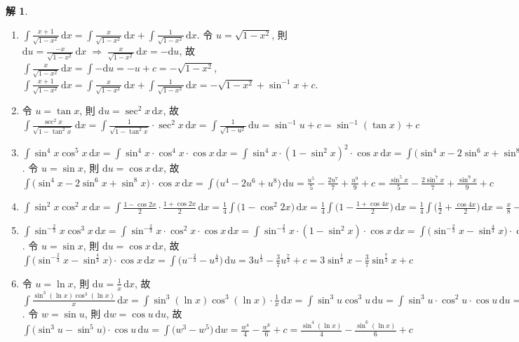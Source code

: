 \documentclass[12pt]{extarticle}
\newcommand{\ds}{\displaystyle}
\newcommand{\ie}{\;\Longrightarrow\;}
\theoremstyle{definition}
\newtheorem*{sol}{解}
\begin{document}
\begin{sol}
\begin{enumerate}
    \item $\ds\int\!\frac{x + 1}{\sqrt{1 - x^2}}\,\text{d}x = \int\!\frac{x}{\sqrt{1 - x^2}}\,\text{d}x + \int\!\frac{1}{\sqrt{1 - x^2}}\,\text{d}x$. 令 $\ds u = \sqrt{1 - x^2}$, 則 $\ds\text{d}u = \frac{-x}{\sqrt{1 - x^2}}\,\text{d}x\ie \frac{x}{\sqrt{1 - x^2}}\,\text{d}x = -\text{d}u$, 故 $\ds\int\!\frac{x}{\sqrt{1 - x^2}}\,\text{d}x = \int-\text{d}u = -u + c = -\sqrt{1 - x^2}$, $\ds\int\!\frac{x + 1}{\sqrt{1 - x^2}}\,\text{d}x = \int\!\frac{x}{\sqrt{1 - x^2}}\,\text{d}x + \int\!\frac{1}{\sqrt{1 - x^2}}\,\text{d}x = -\sqrt{1 - x^2} + \sin^{-1}x + c$. 
    \item 令 $\ds u = \tan x$, 則 $\ds\text{d}u = \sec^2 x\,\text{d}x$, 故 $\ds\int\!\frac{\sec^2 x}{\sqrt{1 - \tan^2 x}}\,\text{d}x = \int\!\frac{1}{\sqrt{1 - \tan^2 x}}\cdot \sec^2 x\,\text{d}x = \int\!\frac{1}{\sqrt{1 - u^2}}\,\text{d}u = \sin^{-1} u + c = \sin^{-1}(\tan{x}) + c $
    \item $\ds\int\!\sin^4 x\cos^5 x\,\text{d}x = \int\!\sin^4 x\cdot\cos^4 x\cdot\cos x\,\text{d}x = \int\!\sin^4x\cdot(1 - \sin^2 x)^2\cdot\cos x\,\text{d}x = \int\!\big(\sin^4x  - 2\sin^6x + \sin^8x\big)\cdot\cos x\,\text{d}x$.  令 $\ds u = \sin x$, 則 $\ds\text{d}u = \cos x\,\text{d}x$, 故 $\ds\int\!\big(\sin^4x  - 2\sin^6x + \sin^8x\big)\cdot\cos x\,\text{d}x = \int\!\big(u^4 - 2u^6 + u^8\big)\,\text{d}u = \frac{u^5}{5} - \frac{2u^7}{7} + \frac{u^9}{9} + c = \frac{\sin^5 x}{5} - \frac{2\sin^7 x}{7} + \frac{\sin^9 x}{9} + c$
    \item $\ds\int\!\sin^2 x\cos^2 x\,\text{d}x = \int\!\frac{1 - \cos 2x}{2}\cdot\frac{1 + \cos 2x}{2}\,\text{d}x = \frac{1}{4}\int\!\big(1 - \cos^2{2x}\big)\,\text{d}x = \frac{1}{4}\int\!\Big(1 - \frac{1 + \cos 4x}{2}\Big)\,\text{d}x = \frac{1}{4}\int\!\Big(\frac{1}{2} + \frac{\cos 4x}{2}\Big)\,\text{d}x = \frac{x}{8} - \frac{\sin 4x}{32} + c$
    \item $\ds\int\!\sin^{-\frac{2}{3}} x\cos^3 x\,\text{d}x = \int\!\sin^{-\frac{2}{3}} x\cdot\cos^2 x\cdot\cos x\,\text{d}x = \int\!\sin^{-\frac{2}{3}} x\cdot(1 - \sin^2 x)\cdot\cos x\,\text{d}x = \int\!\big(\sin^{-\frac{2}{3}} x - \sin^{\frac{4}{3}} x\big)\cdot\cos x\,\text{d}x$. 令 $u = \sin x$, 則 $\ds\text{d}u = \cos x\,\text{d}x$, 故 $\ds\int\!\big(\sin^{-\frac{2}{3}} x - \sin^{\frac{4}{3}} x\big)\cdot\cos x\,\text{d}x = \int\!\big(u^{-\frac{2}{3}} - u^{\frac{4}{3}}\big)\,\text{d}u = 3u^{\frac{1}{3}} - \frac{3}{7}u^{\frac{7}{3}} + c = 3\sin^{\frac{1}{3}}x - \frac{3}{7}\sin^{\frac{7}{3}}x + c$
    \item 令 $\ds u = \ln x$, 則 $\ds\text{d}u = \frac{1}{x}\,\text{d}x$, 故 $\ds\int\!\frac{\sin^3(\ln x)\cos^3(\ln x)}{x}\,\text{d}x = \int\!\sin^3(\ln x)\cos^3(\ln x)\cdot\frac{1}{x}\,\text{d}x = \int\!\sin^3u\cos^3u\,\text{d}u = \int\!\sin^3u\cdot\cos^2u\cdot\cos u\,\text{d}u = \int\!\sin^3 u\big(1 - \sin^2 u\big)\cdot\cos u\,\text{d}u = \int\!\big(\sin^3u - \sin^5u\big)\cdot\cos u\,\text{d}u$. 令 $\ds w = \sin u$, 則 $\ds\text{d}w = \cos u\,\text{d}u$, 故 $\ds\int\!\big(\sin^3u - \sin^5u\big)\cdot\cos u\,\text{d}u = \int\!\big(w^3 - w^5\big)\,\text{d}w = \frac{w^4}{4} - \frac{w^6}{6} + c = \frac{\sin^4(\ln x)}{4} - \frac{\sin^6(\ln x)}{6} + c$

\end{enumerate}
\end{sol}
\end{document}

